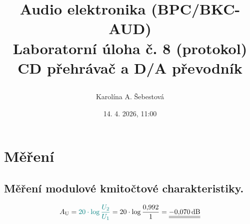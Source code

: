 \documentclass[a4paper, czech]{article}
\title{
	\begin{framed}
		\setstretch{1.5}
		{\large Audio elektronika (BPC/BKC-AUD)}\\
		Laboratorní úloha č. 8 (protokol)\\
		\textbf{CD přehrávač a D/A převodník}
	\end{framed}
	}
\author{Karolína A. Šebestová}
\date{14. 4. 2026, 11:00}
\begin{document}
\maketitle

\section{Měření}

\subsection{Měření modulové kmitočtové charakteristiky.}

\begin{equation}
    A_\text{U} = \textcolor{teal}{20 \cdot \log \frac{U_2}{U_1}} = 20 \cdot \log \frac{0{,}992}{1} = \underline{\underline{-0{,}070\,\text{dB}}}
\end{equation}
\end{document}
